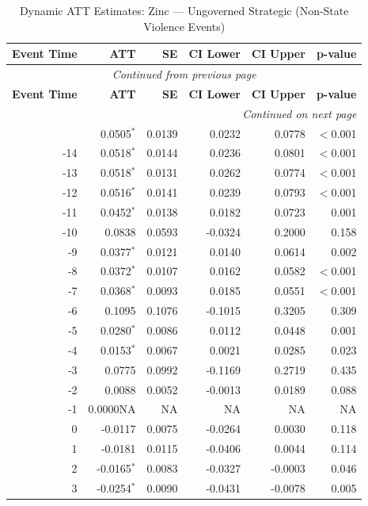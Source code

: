\begin{longtable}{rrrrrr}
\caption{Dynamic ATT Estimates: Zinc --- Ungoverned Strategic (Non-State Violence Events)} \label{tab:zinc_non_state_violence_events} \\
\toprule
\textbf{Event Time} & \textbf{ATT} & \textbf{SE} & \textbf{CI Lower} & \textbf{CI Upper} & \textbf{p-value} \\
\midrule
\endfirsthead
\multicolumn{6}{c}{\textit{Continued from previous page}} \\
\toprule
\textbf{Event Time} & \textbf{ATT} & \textbf{SE} & \textbf{CI Lower} & \textbf{CI Upper} & \textbf{p-value} \\
\midrule
\endhead
\midrule \multicolumn{6}{r}{\textit{Continued on next page}} \\
\endfoot
\bottomrule
\endlastfoot
-15 & 0.0505$^{*}$ & 0.0139 & 0.0232 & 0.0778 & $<$0.001 \\
-14 & 0.0518$^{*}$ & 0.0144 & 0.0236 & 0.0801 & $<$0.001 \\
-13 & 0.0518$^{*}$ & 0.0131 & 0.0262 & 0.0774 & $<$0.001 \\
-12 & 0.0516$^{*}$ & 0.0141 & 0.0239 & 0.0793 & $<$0.001 \\
-11 & 0.0452$^{*}$ & 0.0138 & 0.0182 & 0.0723 & 0.001 \\
-10 & 0.0838 & 0.0593 & -0.0324 & 0.2000 & 0.158 \\
-9 & 0.0377$^{*}$ & 0.0121 & 0.0140 & 0.0614 & 0.002 \\
-8 & 0.0372$^{*}$ & 0.0107 & 0.0162 & 0.0582 & $<$0.001 \\
-7 & 0.0368$^{*}$ & 0.0093 & 0.0185 & 0.0551 & $<$0.001 \\
-6 & 0.1095 & 0.1076 & -0.1015 & 0.3205 & 0.309 \\
-5 & 0.0280$^{*}$ & 0.0086 & 0.0112 & 0.0448 & 0.001 \\
-4 & 0.0153$^{*}$ & 0.0067 & 0.0021 & 0.0285 & 0.023 \\
-3 & 0.0775 & 0.0992 & -0.1169 & 0.2719 & 0.435 \\
-2 & 0.0088 & 0.0052 & -0.0013 & 0.0189 & 0.088 \\
-1 & 0.0000NA & NA & NA & NA & NA \\
0 & -0.0117 & 0.0075 & -0.0264 & 0.0030 & 0.118 \\
1 & -0.0181 & 0.0115 & -0.0406 & 0.0044 & 0.114 \\
2 & -0.0165$^{*}$ & 0.0083 & -0.0327 & -0.0003 & 0.046 \\
3 & -0.0254$^{*}$ & 0.0090 & -0.0431 & -0.0078 & 0.005 \\

\end{longtable}
